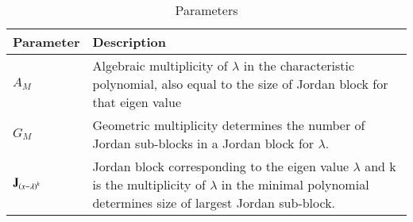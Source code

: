 \documentclass[journal,12pt,twocolumn]{IEEEtran}
\numberwithin{table}{section}
\begin{document}
\begin{table}[ht!]
\begin{center}
\begin{tabular}{|p{2cm}|p{5.5cm}|}
\hline
\textbf{Parameter} & \textbf{Description}
\\ [0.5ex] 
\hline
$A_M$ & Algebraic multiplicity of $\lambda$ in the characteristic polynomial, also equal to the size of Jordan block for that eigen value
\\ [0.5ex] 
\hline
$G_M$ & Geometric multiplicity determines the number of Jordan sub-blocks in a Jordan block for $\lambda$.
\\ [0.5ex] 
\hline
$\mathbf{J}_{\left(x-\lambda\right)^k}$ & Jordan block corresponding to the eigen value $\lambda$ and k is the multiplicity of $\lambda$ in the minimal polynomial determines size of largest Jordan sub-block.
\\ [0.5ex] 
\hline
\end{tabular}
\caption{Parameters}
\label{table:1}
\end{center}
\vspace{-0.5cm}
\end{table}
\renewcommand{\thetable}{2}
\end{document}
